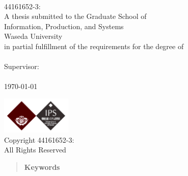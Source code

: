 \documentclass[11pt,
            english,
            oneside,
            liststotoc,
            singlespacing,
            headsepline,
            consistentlayout]{style}
\theoremstyle{definition}
\begin{document}
\begin{titlepage}
\begin{center}
\thispagestyle{empty}
\vspace*{.02\textheight}
{\ttitle} \\[2.5cm] %
{44161652-3: \authorname} \\[2.5cm] %
{
    A thesis submitted to the Graduate School of \\
    Information, Production, and Systems\\
    Waseda University\\
    in partial fulfillment of the requirements for the degree of
} \\[1.2cm]

{\degreename} \\[2.5cm]
{Supervisor: \supname} \vfill
{\deptname}\\[1.0cm]
{\univname}\\[1.0cm]
{\today} \vfill

\includegraphics[width=0.25\textwidth]{wasedaLogo}\\[0.1cm]
{Copyright  44161652-3: \authorname} \\[0.2cm]
All Rights Reserved
\end{center}
\end{titlepage}



\begin{abstract}
\addchaptertocentry{\abstractname} %


\vfill
\noindent \textbf{Keywords}\textemdash\keywordnames
\end{abstract}


\begin{acknowledgements}
\addchaptertocentry{\acknowledgementname} %

\end{acknowledgements}
\end{document}
